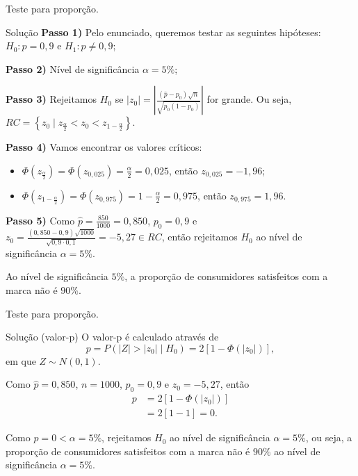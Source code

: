 \documentclass[8pt]{beamer}
\begin{document}
\begin{frame}{Teste para proporção.}

\begin{block}{Solução}
	\textbf{Passo 1)} Pelo enunciado, queremos testar as seguintes hipóteses: $H_0: p=0,9$ e $H_1:p \neq 0,9$;
	
	\textbf{Passo 2)} Nível de significância $\alpha=5\%$;
	
	\textbf{Passo 3)} Rejeitamos $H_0$ se $\lvert z_0  \rvert = \left\lvert \frac{(\hat{p} - p_0)\sqrt{n}}{\sqrt{p_0(1-p_0)}} \right\rvert$ for grande. Ou seja, $RC=\left\{ z_0 \mid z_{\frac{\alpha}{2}} < z_0 < z_{1-\frac{\alpha}{2}} \right\}$.
	
	\textbf{Passo 4)} Vamos encontrar os valores críticos:
	\begin{itemize}
		\item $\Phi\left( z_\frac{\alpha}{2} \right) = \Phi\left( z_{0,025} \right) = \frac{\alpha}{2} = 0,025$, então $z_{0,025} = -1,96$;
		\item $\Phi\left( z_{1-\frac{\alpha}{2}} \right) = \Phi\left( z_{0,975} \right) =1- \frac{\alpha}{2} = 0,975$, então $z_{0,975} = 1,96$.
	\end{itemize}
	
	\textbf{Passo 5)} Como $\hat{p} = \frac{850}{1000}=0,850$, $p_0 = 0,9$ e $z_0 = \frac{(0,850 - 0,9)\sqrt{1000}}{\sqrt{0,9 \cdot 0,1}} = -5,27 \in RC$, então rejeitamos $H_0$ ao nível de significância $\alpha=5\%$.
	
	Ao nível de significância $5\%$, a proporção de consumidores satisfeitos com a marca não é $90\%$.
\end{block}

\end{frame}

\begin{frame}{Teste para proporção.}

\large

\begin{block}{Solução (valor-p)}
	O valor-p é calculado através de
	$$p=P\left( \lvert Z \rvert > \lvert z_0 \rvert \mid H_0\right) = 2\left[ 1 - \Phi\left(\lvert z_0 \rvert\right) \right],$$
	em que $Z \sim N(0,1)$.
	
	Como $\hat{p}=0,850$, $n=1000$, $p_0=0,9$ e $z_0=-5,27$, então
	\begin{align*}
		p &= 2 \left[ 1 - \Phi\left( \lvert z_0 \rvert\right) \right]\\
		&= 2\left[1 - 1\right] = 0.
	\end{align*}
	
	Como $p=0 < \alpha=5\%$, rejeitamos $H_0$ ao nível de significância $\alpha=5\%$, ou seja, a proporção de consumidores satisfeitos com a marca não é $90\%$ ao nível de significância $\alpha=5\%$.
\end{block}

\normalsize

\end{frame}
\end{document}
